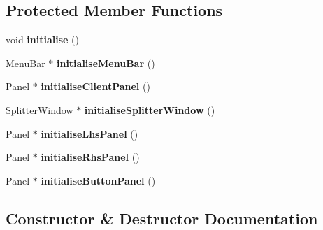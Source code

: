 \subsection*{Protected Member Functions}
\begin{DoxyCompactItemize}
\item 
void {\bfseries initialise} ()\hypertarget{class_application_1_1_main_frame_window_afbe4226dcd70f22c2ae32062881ceca6}{}\label{class_application_1_1_main_frame_window_afbe4226dcd70f22c2ae32062881ceca6}

\item 
Menu\+Bar $\ast$ {\bfseries initialise\+Menu\+Bar} ()\hypertarget{class_application_1_1_main_frame_window_abdb6890f8b5edd930f93f2fe51a5e181}{}\label{class_application_1_1_main_frame_window_abdb6890f8b5edd930f93f2fe51a5e181}

\item 
Panel $\ast$ {\bfseries initialise\+Client\+Panel} ()\hypertarget{class_application_1_1_main_frame_window_aa9064ca4429720b231234fba743c4b0f}{}\label{class_application_1_1_main_frame_window_aa9064ca4429720b231234fba743c4b0f}

\item 
Splitter\+Window $\ast$ {\bfseries initialise\+Splitter\+Window} ()\hypertarget{class_application_1_1_main_frame_window_a88ea2a7e70bcd1a650c3834883d3deef}{}\label{class_application_1_1_main_frame_window_a88ea2a7e70bcd1a650c3834883d3deef}

\item 
Panel $\ast$ {\bfseries initialise\+Lhs\+Panel} ()\hypertarget{class_application_1_1_main_frame_window_ac0a4ced572ac913cdc441d1a35e97842}{}\label{class_application_1_1_main_frame_window_ac0a4ced572ac913cdc441d1a35e97842}

\item 
Panel $\ast$ {\bfseries initialise\+Rhs\+Panel} ()\hypertarget{class_application_1_1_main_frame_window_a9d9bf15eb75cbce36bca4e22ba144161}{}\label{class_application_1_1_main_frame_window_a9d9bf15eb75cbce36bca4e22ba144161}

\item 
Panel $\ast$ {\bfseries initialise\+Button\+Panel} ()\hypertarget{class_application_1_1_main_frame_window_acc4b68465595b19ab6d23762b7ce1907}{}\label{class_application_1_1_main_frame_window_acc4b68465595b19ab6d23762b7ce1907}

\end{DoxyCompactItemize}


\subsection{Constructor \& Destructor Documentation}
